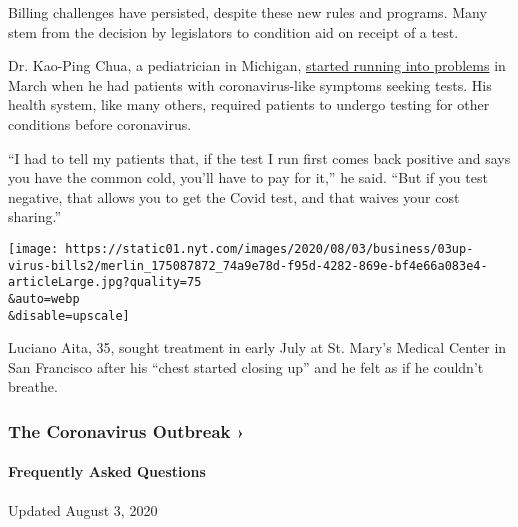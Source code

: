 Billing challenges have persisted, despite these new rules and programs.
Many stem from the decision by legislators to condition aid on receipt
of a test.

Dr. Kao-Ping Chua, a pediatrician in Michigan,
\href{https://www.healthaffairs.org/do/10.1377/hblog20200413.783118/full/}{started
running into problems} in March when he had patients with
coronavirus-like symptoms seeking tests. His health system, like many
others, required patients to undergo testing for other conditions before
coronavirus.

``I had to tell my patients that, if the test I run first comes back
positive and says you have the common cold, you'll have to pay for it,''
he said. ``But if you test negative, that allows you to get the Covid
test, and that waives your cost sharing.''

\texttt{[image: https://static01.nyt.com/images/2020/08/03/business/03up-virus-bills2/merlin\_175087872\_74a9e78d-f95d-4282-869e-bf4e66a083e4-articleLarge.jpg?quality=75\\\&auto=webp\\\&disable=upscale]}

Luciano Aita, 35, sought treatment in early July at St. Mary's Medical
Center in San Francisco after his ``chest started closing up'' and he
felt as if he couldn't breathe.

\href{https://www.nytimes.com/news-event/coronavirus?action=click\&pgtype=Article\&state=default\&region=MAIN_CONTENT_3\&context=storylines_faq}{}

\hypertarget{the-coronavirus-outbreak-}{%
\subsubsection{The Coronavirus Outbreak
›}\label{the-coronavirus-outbreak-}}

\hypertarget{frequently-asked-questions}{%
\paragraph{Frequently Asked
Questions}\label{frequently-asked-questions}}

Updated August 3, 2020

